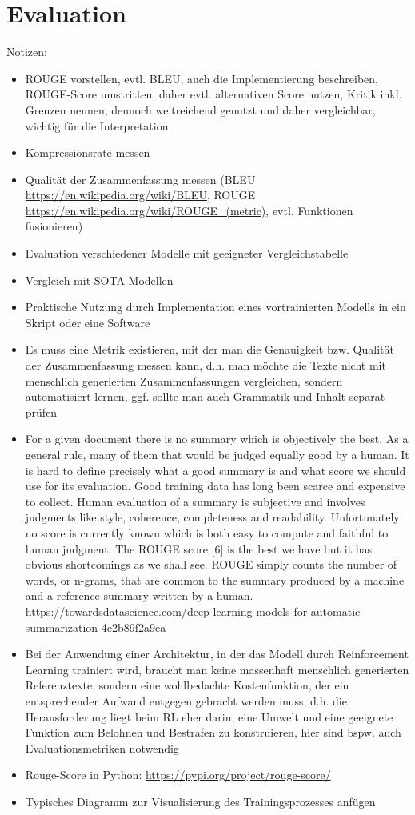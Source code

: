 \section{Evaluation}
Notizen:
\begin{itemize}
	\item ROUGE vorstellen, evtl. BLEU, auch die Implementierung beschreiben, ROUGE-Score umstritten, daher evtl. alternativen Score nutzen, Kritik inkl. Grenzen nennen, dennoch weitreichend genutzt und daher vergleichbar, wichtig für die Interpretation
	\item Kompressionsrate messen
	\item Qualität der Zusammenfassung messen (BLEU \url{https://en.wikipedia.org/wiki/BLEU}, ROUGE \url{https://en.wikipedia.org/wiki/ROUGE_(metric)}, evtl. Funktionen fusionieren)
	\item Evaluation verschiedener Modelle mit geeigneter Vergleichstabelle
	\item Vergleich mit SOTA-Modellen
	\item Praktische Nutzung durch Implementation eines vortrainierten Modells in ein Skript oder eine Software
	\item Es muss eine Metrik existieren, mit der man die Genauigkeit bzw. Qualität der Zusammenfassung messen kann, d.h. man möchte die Texte nicht mit menschlich generierten Zusammenfassungen vergleichen, sondern automatisiert lernen, ggf. sollte man auch Grammatik und Inhalt separat prüfen
	\item For a given document there is no summary which is objectively the best. As a general rule, many of them that would be judged equally good by a human. It is hard to define precisely what a good summary is and what score we should use for its evaluation. Good training data has long been scarce and expensive to collect. Human evaluation of a summary is subjective and involves judgments like style, coherence, completeness and readability. Unfortunately no score is currently known which is both easy to compute and faithful to human judgment. The ROUGE score [6] is the best we have but it has obvious shortcomings as we shall see. ROUGE simply counts the number of words, or n-grams, that are common to the summary produced by a machine and a reference summary written by a human. \url{https://towardsdatascience.com/deep-learning-models-for-automatic-summarization-4c2b89f2a9ea}
	\item Bei der Anwendung einer Architektur, in der das Modell durch Reinforcement Learning trainiert wird, braucht man keine massenhaft menschlich generierten Referenztexte, sondern eine wohlbedachte Kostenfunktion, der ein entsprechender Aufwand entgegen gebracht werden muss, d.h. die Herausforderung liegt beim RL eher darin, eine Umwelt und eine geeignete Funktion zum Belohnen und Bestrafen zu konstruieren, hier sind bspw. auch Evaluationsmetriken notwendig
	\item Rouge-Score in Python: \url{https://pypi.org/project/rouge-score/}
	\item Typisches Diagramm zur Visualisierung des Trainingsprozesses anfügen
\end{itemize}
